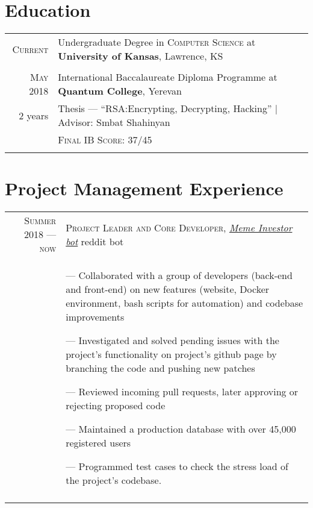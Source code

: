 \documentclass[a4paper,10pt]{article}
\begin{document}
\section{Education}
\begin{tabular}{rl}

  \textsc{Current} & Undergraduate Degree in \textsc{Computer Science} at \normalsize\textbf{University of Kansas}, Lawrence, KS\\
  \\
  
  \textsc{May} 2018& International Baccalaureate Diploma Programme at \textbf{Quantum College}, Yerevan\\
  2 years&Thesis --- ``RSA:\@ Encrypting, Decrypting, Hacking'' | Advisor: Smbat Shahinyan\\
                   &\textsc{Final IB Score}: 37/45 \\&\\
  
\end{tabular}

\section{Project Management Experience}
\begin{tabular}{r|p{11cm}}
  \textsc{Summer 2018 --- now} &  \textsc{Project Leader and Core Developer}, \emph{\href{https://github.com/MemeInvestor/memeinvestor_bot}{Meme Investor bot}} reddit bot\\&\footnotesize{
  --- Collaborated with a group of developers (back-end and front-end) on new features (website, Docker environment, bash scripts for automation) and codebase improvements

  --- Investigated and solved pending issues with the project's functionality on project's github page by branching the code and pushing new patches

  --- Reviewed incoming pull requests, later approving or rejecting proposed code

  --- Maintained a production database with over 45,000 registered users

  --- Programmed test cases to check the stress load of the project's codebase.
  } \\\multicolumn{2}{c}{}\\
\end{tabular}
\end{document}
